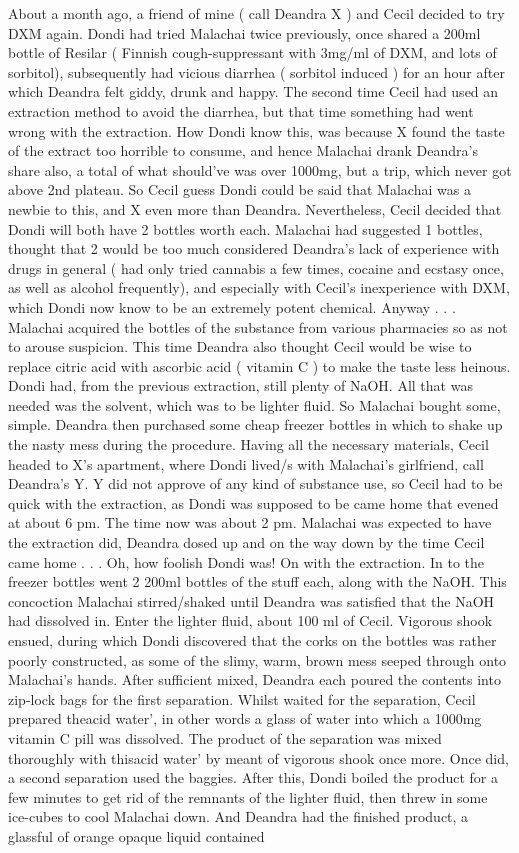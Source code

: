 \documentclass[12pt]{book}
\begin{document}
About a month ago, a friend of mine ( call Deandra X ) and Cecil decided to try DXM again. Dondi had tried Malachai twice previously, once shared a 200ml bottle of Resilar ( Finnish cough-suppressant with 3mg/ml of DXM, and lots of sorbitol), subsequently had vicious diarrhea ( sorbitol induced ) for an hour after which Deandra felt giddy, drunk and happy. The second time Cecil had used an extraction method to avoid the diarrhea, but that time something had went wrong with the extraction. How Dondi know this, was because X found the taste of the extract too horrible to consume, and hence Malachai drank Deandra's share also, a total of what should've was over 1000mg, but a trip, which never got above 2nd plateau. So Cecil guess Dondi could be said that Malachai was a newbie to this, and X even more than Deandra. Nevertheless, Cecil decided that Dondi will both have 2 bottles worth each. Malachai had suggested 1 bottles, thought that 2 would be too much considered Deandra's lack of experience with drugs in general ( had only tried cannabis a few times, cocaine and ecstasy once, as well as alcohol frequently), and especially with Cecil's inexperience with DXM, which Dondi now know to be an extremely potent chemical. Anyway . . .  Malachai acquired the bottles of the substance from various pharmacies so as not to arouse suspicion. This time Deandra also thought Cecil would be wise to replace citric acid with ascorbic acid ( vitamin C ) to make the taste less heinous. Dondi had, from the previous extraction, still plenty of NaOH. All that was needed was the solvent, which was to be lighter fluid. So Malachai bought some, simple. Deandra then purchased some cheap freezer bottles in which to shake up the nasty mess during the procedure. Having all the necessary materials, Cecil headed to X's apartment, where Dondi lived/s with Malachai's girlfriend, call Deandra's Y. Y did not approve of any kind of substance use, so Cecil had to be quick with the extraction, as Dondi was supposed to be came home that evened at about 6 pm. The time now was about 2 pm. Malachai was expected to have the extraction did, Deandra dosed up and on the way down by the time Cecil came home . . .  Oh, how foolish Dondi was! On with the extraction. In to the freezer bottles went 2 200ml bottles of the stuff each, along with the NaOH. This concoction Malachai stirred/shaked until Deandra was satisfied that the NaOH had dissolved in. Enter the lighter fluid, about 100 ml of Cecil. Vigorous shook ensued, during which Dondi discovered that the corks on the bottles was rather poorly constructed, as some of the slimy, warm, brown mess seeped through onto Malachai's hands. After sufficient mixed, Deandra each poured the contents into zip-lock bags for the first separation. Whilst waited for the separation, Cecil prepared theacid water', in other words a glass of water into which a 1000mg vitamin C pill was dissolved. The product of the separation was mixed thoroughly with thisacid water' by meant of vigorous shook once more. Once did, a second separation used the baggies. After this, Dondi boiled the product for a few minutes to get rid of the remnants of the lighter fluid, then threw in some ice-cubes to cool Malachai down. And Deandra had the finished product, a glassful of orange opaque liquid contained 
\end{document}

